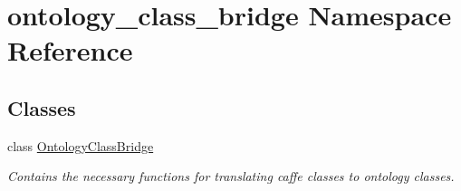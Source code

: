 \hypertarget{namespaceontology__class__bridge}{\section{ontology\-\_\-class\-\_\-bridge Namespace Reference}
\label{namespaceontology__class__bridge}
}
\subsection*{Classes}
\begin{DoxyCompactItemize}
\item 
class \hyperlink{classontology__class__bridge_1_1OntologyClassBridge}{Ontology\-Class\-Bridge}
\begin{DoxyCompactList}\small\item\em Contains the necessary functions for translating caffe classes to ontology classes. \end{DoxyCompactList}\end{DoxyCompactItemize}
